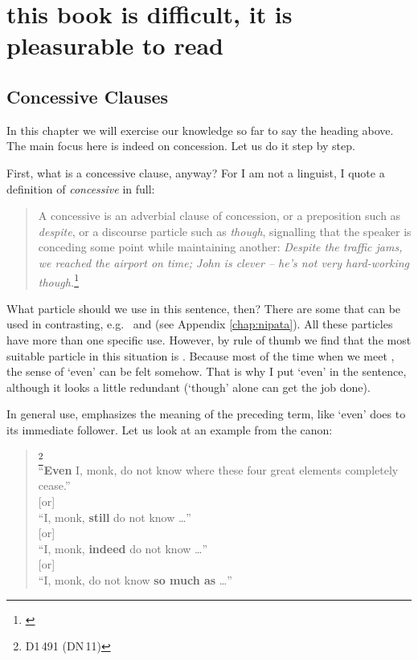 \chapter[\headhl{Even though} this book is difficult]{ this book is difficult, it is pleasurable to read}\label{chap:pi}

{}
\section*{Concessive Clauses}

In this chapter we will exercise our knowledge so far to say the heading above. The main focus here is indeed on concession. Let us do it step by step.

First, what is a concessive clause, anyway? For I am not a linguist, I quote a definition of \emph{concessive} in full:

\begin{quote}
A concessive is an adverbial clause of concession, or a preposition such as \emph{despite}, or a discourse particle such as \emph{though}, signalling that the speaker is conceding some point while maintaining another: \textit{Despite the traffic jams, we reached the airport on time; John is clever -- he's not very hard-working though.}\footnote{\citealp[p.~96]{brownmiller:dict}}
\end{quote}

What particle should we use in this sentence, then? There are some that can be used in contrasting, e.g.\  and  (see Appendix \ref{chap:nipata}). All these particles have more than one specific use. However, by rule of thumb we find that the most suitable particle in this situation is . Because most of the time when we meet , the sense of `even' can be felt somehow. That is why I put `even' in the sentence, although it looks a little redundant (`though' alone can get the job done).

In general use,  emphasizes the meaning of the preceding term, like `even' does to its immediate follower. Let us look at an example from the canon:

\begin{quote}
\footnote{D1\,491 (DN\,11)}\\
``\textbf{Even} I, monk, do not know where these four great elements completely cease.''\\{[or]}\\
``I, monk, \textbf{still} do not know \ldots''\\{[or]}\\
``I, monk, \textbf{indeed} do not know \ldots''\\{[or]}\\
``I, monk, do not know \textbf{so much as} \ldots''\\
\end{quote}

